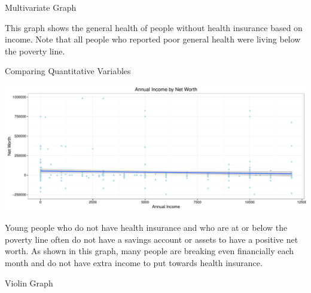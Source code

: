 \documentclass[final]{beamer}\usepackage[]{graphicx}\usepackage[]{color}
\makeatletter
\def\maxwidth{ %
  \ifdim\Gin@nat@width>\linewidth
    \linewidth
  \else
    \Gin@nat@width
  \fi
}
\newenvironment{knitrout}{}{} %
\makeatother
\begin{document}
\begin{frame}[fragile]
\begin{columns}[t]
\begin{column}{0.31\linewidth}
\begin{minipage}[t][.955\textheight]{\linewidth}
\begin{block}{Multivariate Graph}
\begin{knitrout}
{}



\end{knitrout}

This graph shows the general health of people without health insurance based on income. Note that all people who reported poor general health were living below the poverty line.

\vspace{-1ex}
\end{block}
\vfill

\begin{block}{Comparing Quantitative Variables}
\vspace{0ex}

\begin{knitrout}
\color{fgcolor}

{\centering \includegraphics[width=\maxwidth]{figure/LineGraph-1} 

}



\end{knitrout}

Young people who do not have health insurance and who are at or below the poverty line often do not have a savings account or assets to have a positive net worth. As shown in this graph, many people are breaking even financially each month and do not have extra income to put towards health insurance.

\vspace{-1ex}
\end{block}
\vfill

\begin{block}{Violin Graph}
\vspace{0ex}
\begin{knitrout}
\color{fgcolor}


\end{knitrout}
\end{block}
\end{minipage}
\end{column}
\end{columns}
\end{frame}
\end{document}
